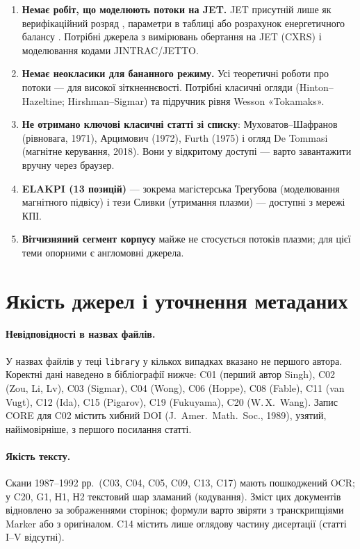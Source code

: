 \documentclass[11pt,a4paper]{article}
\newcommand{\file}[1]{\texttt{\small #1}}
\begin{document}
\begin{enumerate}
  \item \textbf{Немає робіт, що моделюють потоки на JET.} JET присутній лише як
        верифікаційний розряд \cite{Hoppe2022}, параметри в таблиці \cite{vanVugt2019}
        або розрахунок енергетичного балансу \cite{Tyshchenko2021}. Потрібні джерела
        з вимірювань обертання на JET (CXRS) і моделювання кодами JINTRAC/JETTO.
  \item \textbf{Немає неокласики для бананного режиму.} Усі теоретичні роботи про потоки
        --- для високої зіткненнєвості. Потрібні класичні огляди
        (Hinton--Hazeltine; Hirshman--Sigmar) та підручник рівня Wesson «Tokamaks».
  \item \textbf{Не отримано ключові класичні статті зі списку}: Муховатов--Шафранов
        (рівновага, 1971), Арцимович (1972), Furth (1975) і огляд De Tommasi
        (магнітне керування, 2018). Вони у відкритому доступі --- варто завантажити
        вручну через браузер.
  \item \textbf{ELAKPI (13 позицій)} --- зокрема магістерська Трегубова (моделювання
        магнітного підвісу) і тези Сливки (утримання плазми) --- доступні з мережі КПІ.
  \item \textbf{Вітчизняний сегмент корпусу} майже не стосується потоків плазми;
        для цієї теми опорними є англомовні джерела.
\end{enumerate}

\section{Якість джерел і уточнення метаданих}

\paragraph{Невідповідності в назвах файлів.} У назвах файлів у теці \file{library}
у кількох випадках вказано не першого автора. Коректні дані наведено в бібліографії
нижче: C01 (перший автор Singh), C02 (Zou, Li, Lv), C03 (Sigmar), C04 (Wong),
C06 (Hoppe), C08 (Fable), C11 (van Vugt), C12 (Ida), C15 (Pigarov), C19 (Fukuyama),
C20 (W.\,X.~Wang). Запис CORE для C02 містить хибний DOI (J.\ Amer.\ Math.\ Soc., 1989),
узятий, найімовірніше, з першого посилання статті.

\paragraph{Якість тексту.} Скани 1987--1992 рр.\ (C03, C04, C05, C09, C13, C17) мають
пошкоджений OCR; у C20, G1, Н1, Н2 текстовий шар зламаний (кодування). Зміст цих
документів відновлено за зображеннями сторінок; формули варто звіряти з
транскрипціями Marker або з оригіналом. C14 містить лише оглядову частину
дисертації (статті I--V відсутні).
\end{document}
